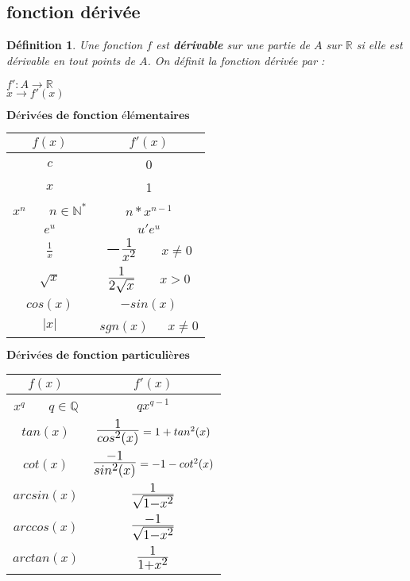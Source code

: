 \documentclass[12pt, a4paper]{book}
\newtheorem*{definition}{Définition}
\def\mathLarge#1{\mbox{\LARGE $#1$}}
\begin{document}
\subsection{fonction dérivée}
\begin{definition}
    Une fonction $f$ est \textbf{dérivable} sur une partie de $A$ sur $\mathbb{R}$ si elle est dérivable en tout points de $A$. On définit la fonction dérivée par :\\
    \begin{center}
        $f': A \to \mathbb{R}$\\
        $x \to f'(x)$
    \end{center}
\end{definition}
\pagebreak
$\textbf{Dérivées de fonction élémentaires}$
\begin{center}
    \begin{tabular}{ |c | c| } 
     \hline
     $f(x)$& $f'(x)$\\ 
     \hline
     $c$ & 0 \\ 
     $x$ & 1 \\ 
     $x^n$ \ \ \ $n\in \mathbb{N^*}$ & $n*x^{n-1}$  \\ 
     $e^u$  & $u' e^u$ \\ 
     $\frac{1}{x}$ & $\mathLarge{-\frac{1}{x^2}}$ \ \ \ $ x\not = 0$ \\ 
     $\sqrt{x}$ & $\mathLarge{\frac{1}{2\sqrt{x}}}$ \ \ \ $x>0$ \\ 
     $cos(x)$ & $-sin(x)$\\
     $\lvert x \rvert$ & $sgn(x)$\ \ \ $x \not = 0$\\ 

     \hline
    \end{tabular}
\end{center}
    $\textbf{Dérivées de fonction particulières}$
    \begin{center}
    \begin{tabular}{ |c |c | }
     \hline
     $f(x)$& $f'(x)$ \\ 
     \hline
     $x^q$ \ \ \ $q \in \mathbb{Q}$& $qx^{q-1}$ \\  
     $tan(x)$ &  $\mathLarge{\frac{1}{cos^2(x)}} = 1+tan^2(x)$\\ 
     $cot(x)$ &   $\mathLarge{\frac{-1}{sin^2(x)}} = -1-cot^2(x)$ \\ 
     $arcsin(x)$ &  $\mathLarge{\frac{1}{\sqrt{1-x^2}}}$   \\ 
     $arccos(x)$ & $\mathLarge{\frac{-1}{\sqrt{1-x^2}}}$  \\
     $arctan(x)$ & $\mathLarge{\frac{1}{1+x^2}}$   \\

     \hline
    \end{tabular}
    \end{center}
\end{document}
